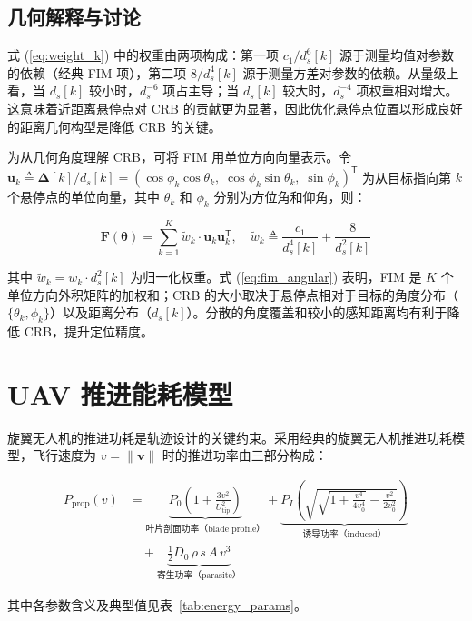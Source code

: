 \subsection{几何解释与讨论}

式 (\ref{eq:weight_k}) 中的权重由两项构成：第一项 $c_1/d_s^6[k]$ 源于测量均值对参数的依赖（经典 FIM 项），第二项 $8/d_s^4[k]$ 源于测量方差对参数的依赖。从量级上看，当 $d_s[k]$ 较小时，$d_s^{-6}$ 项占主导；当 $d_s[k]$ 较大时，$d_s^{-4}$ 项权重相对增大。这意味着近距离悬停点对 CRB 的贡献更为显著，因此优化悬停点位置以形成良好的距离几何构型是降低 CRB 的关键。

为从几何角度理解 CRB，可将 FIM 用单位方向向量表示。令 $\mathbf{u}_k\triangleq\bm{\Delta}[k]/d_s[k]=(\cos\phi_k\cos\theta_k,\;\cos\phi_k\sin\theta_k,\;\sin\phi_k)^{\mathsf{T}}$ 为从目标指向第 $k$ 个悬停点的单位向量，其中 $\theta_k$ 和 $\phi_k$ 分别为方位角和仰角，则：

\begin{equation}
\mathbf{F}(\bm{\theta})=\sum_{k=1}^{K}\tilde{w}_k\cdot\mathbf{u}_k\mathbf{u}_k^{\mathsf{T}},\quad
\tilde{w}_k\triangleq\frac{c_1}{d_s^4[k]}+\frac{8}{d_s^2[k]}
\label{eq:fim_angular}
\end{equation}

其中 $\tilde{w}_k=w_k\cdot d_s^2[k]$ 为归一化权重。式 (\ref{eq:fim_angular}) 表明，FIM 是 $K$ 个单位方向外积矩阵的加权和；CRB 的大小取决于悬停点相对于目标的角度分布（$\{\theta_k,\phi_k\}$）以及距离分布（$d_s[k]$）。分散的角度覆盖和较小的感知距离均有利于降低 CRB，提升定位精度。

\section{UAV 推进能耗模型}

旋翼无人机的推进功耗是轨迹设计的关键约束。采用经典的旋翼无人机推进功耗模型\cite{Zeng2016}，飞行速度为 $v=\|\mathbf{v}\|$ 时的推进功率由三部分构成：

\begin{align}
P_{\mathrm{prop}}(v)&=\underbrace{P_0\!\left(1+\frac{3v^2}{U_{\mathrm{tip}}^2}\right)}_{\text{叶片剖面功率（blade profile）}}
+\underbrace{P_I\!\left(\sqrt{\sqrt{1+\frac{v^4}{4v_0^4}}-\frac{v^2}{2v_0^2}}\right)}_{\text{诱导功率（induced）}}\nonumber\\
&\quad+\underbrace{\frac{1}{2}D_0\,\rho\, s\, A\, v^3}_{\text{寄生功率（parasite）}}
\label{eq:propulsion_power}
\end{align}

其中各参数含义及典型值见表~\ref{tab:energy_params}。

